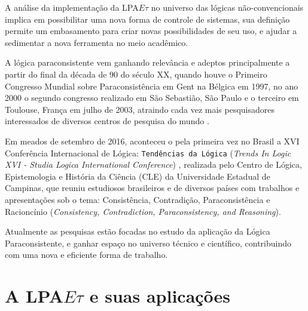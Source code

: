 A análise da implementação da LPA$E\tau$ no universo das lógicas não-convencionais implica em possibilitar uma nova forma de controle de sistemas, sua definição permite um embasamento para criar novas possibilidades de seu uso, e ajudar a sedimentar a nova ferramenta no meio acadêmico. 




A lógica paraconsistente vem ganhando relevância e adeptos 
principalmente a partir do final da década de 90 do século XX, 
quando houve o Primeiro Congresso Mundial sobre 
Paraconsistência em Gent na Bélgica em 1997, 
no ano 2000 o segundo congresso realizado em São Sebastião, São Paulo e o 
terceiro em Toulouse, França em julho de 2003, 
atraindo cada vez mais pesquisadores interessados de 
diversos centros de pesquisa do mundo \cite{DecioKrause}. 

Em meados de setembro de 2016, 
aconteceu o pela primeira vez no Brasil a 
XVI Conferência Internacional de Lógica: 
\texttt{Tendências da Lógica} (\emph{Trends In Logic XVI - 
Studia Logica International Conference}) \cite{trendsinlogic}, 
realizada pelo Centro de Lógica, Epistemologia e História da Ciência (CLE) da 
Universidade Estadual de Campinas, 
que reuniu estudiosos brasileiros e de diversos países com 
trabalhos e apresentações sob o tema: 
Consistência, Contradição, Paraconsistência e Racioncínio 
(\emph{Consistency, Contradiction, Paraconsistency, and Reasoning}).

Atualmente as pesquisas estão focadas no estudo da 
aplicação da Lógica Paraconsistente, 
e ganhar espaço no universo técnico e científico, 
contribuindo com uma nova e eficiente forma de trabalho.




\section{A LPA$E\tau$ e suas aplicações}

